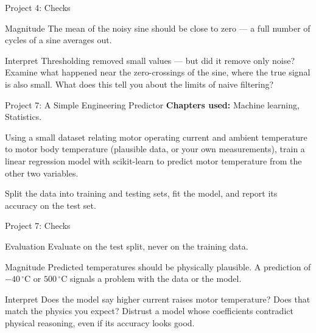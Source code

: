 \documentclass[9pt,aspectratio=169,xcolor=table]{beamer}
\begin{document}
\begin{frame}{Project 4: Checks}
    \leavevmode
    \begin{block}{Magnitude}
        The mean of the noisy sine should be close to zero --- a full
        number of cycles of a sine averages out.
    \end{block}

    \vspace{3mm}
    \begin{alertblock}{Interpret}
        Thresholding removed small values --- but did it remove only
        noise? Examine what happened near the \alert{zero-crossings} of
        the sine, where the true signal is also small. What does this
        tell you about the limits of naive filtering?
    \end{alertblock}
\end{frame}

\begin{frame}{Project 7: A Simple Engineering Predictor}
    \leavevmode
    \textbf{Chapters used:} Machine learning, Statistics.

    \vspace{2mm}
    Using a small dataset relating motor operating current and ambient
    temperature to motor body temperature (plausible data, or your own
    measurements), train a \alert{linear regression} model with
    scikit-learn to predict motor temperature from the other two
    variables.

    \vspace{2mm}
    Split the data into training and testing sets, fit the model, and
    report its accuracy on the test set.
\end{frame}

\begin{frame}{Project 7: Checks}
    \leavevmode
    \begin{block}{Evaluation}
        Evaluate on the test split, \alert{never} on the training data.
    \end{block}

    \vspace{2mm}
    \begin{block}{Magnitude}
        Predicted temperatures should be physically plausible. A
        prediction of $-40\,^{\circ}\text{C}$ or $500\,^{\circ}\text{C}$
        signals a problem with the data or the model.
    \end{block}

    \vspace{2mm}
    \begin{alertblock}{Interpret}
        Does the model say higher current raises motor temperature? Does
        that match the physics you expect? Distrust a model whose
        coefficients contradict physical reasoning, even if its accuracy
        looks good.
    \end{alertblock}
\end{frame}
\end{document}
